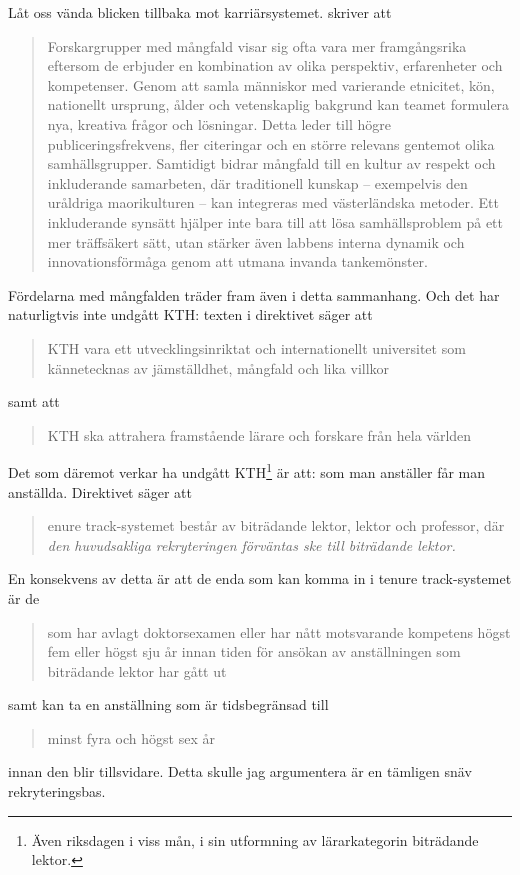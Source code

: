 \documentclass[a4paper,oneside,article,swedish]{memoir}
\begin{document}
Låt oss vända blicken tillbaka mot karriärsystemet.
\Textcite{DiverseLabs} skriver att
\blockcquote[%
  sammanfattat av OpenAI:s modell o3-mini.%
]{DiverseLabs}{%
  Forskargrupper med mångfald visar sig ofta vara mer framgångsrika eftersom de 
  erbjuder en kombination av olika perspektiv, erfarenheter och kompetenser. 
  Genom att samla människor med varierande etnicitet, kön, nationellt ursprung, 
  ålder och vetenskaplig bakgrund kan teamet formulera nya, kreativa frågor och 
  lösningar. Detta leder till högre publiceringsfrekvens, fler citeringar och 
  en större relevans gentemot olika samhällsgrupper. Samtidigt bidrar mångfald 
  till en kultur av respekt och inkluderande samarbeten, där traditionell 
  kunskap – exempelvis den uråldriga maorikulturen – kan integreras med 
  västerländska metoder. Ett inkluderande synsätt hjälper inte bara till att 
  lösa samhällsproblem på ett mer träffsäkert sätt, utan stärker även labbens 
  interna dynamik och innovationsförmåga genom att utmana invanda 
  tankemönster.%
}
Fördelarna med mångfalden träder fram även i detta sammanhang.
Och det har naturligtvis inte undgått KTH:
texten i direktivet säger att
\blockcquote[s.~1]{direktiv}{%
  KTH  vara ett utvecklingsinriktat och internationellt 
  universitet som kännetecknas av jämställdhet, mångfald och lika villkor%
} samt att
\blockcquote[s.~1]{direktiv}{%
  KTH ska attrahera framstående lärare och forskare från hela världen%
}.
Det som däremot verkar ha undgått KTH\footnote{%
  Även riksdagen i viss mån, i sin utformning av lärarkategorin biträdande 
  lektor.
} är att: som man anställer får man anställda.
Direktivet säger att
\blockcquote[s.~2, min emfas]{direktiv}{%
  enure track-systemet består av biträdande lektor, lektor och 
  professor, där \emph{den huvudsakliga rekryteringen förväntas ske till 
  biträdande lektor.}%
}
En konsekvens av detta är att de enda som kan komma in i tenure track-systemet 
är de
\blockcquote[4 kap, 4 a §]{Högskoleförordningen}{%
  som har avlagt doktorsexamen eller har nått motsvarande kompetens högst fem 
  eller högst sju år innan tiden för ansökan av anställningen som biträdande 
  lektor har gått ut%
} samt kan ta en anställning som är tidsbegränsad till
\blockcquote[4 kap, 12 a §]{Högskoleförordningen}{%
  minst fyra och högst sex år%
} innan den blir tillsvidare.
Detta skulle jag argumentera är en tämligen snäv rekryteringsbas.
\end{document}
